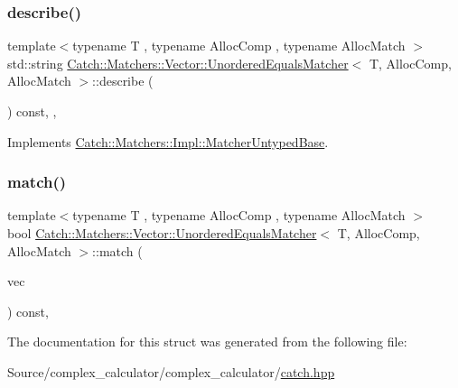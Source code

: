 \subsubsection{\texorpdfstring{describe()}{describe()}}
{\footnotesize\ttfamily template$<$typename T , typename Alloc\+Comp , typename Alloc\+Match $>$ \\
std\+::string \mbox{\hyperlink{struct_catch_1_1_matchers_1_1_vector_1_1_unordered_equals_matcher}{Catch\+::\+Matchers\+::\+Vector\+::\+Unordered\+Equals\+Matcher}}$<$ T, Alloc\+Comp, Alloc\+Match $>$\+::describe (\begin{DoxyParamCaption}{ }\end{DoxyParamCaption}) const\hspace{0.3cm}{\ttfamily [inline]}, {\ttfamily [override]}, {\ttfamily [virtual]}}



Implements \mbox{\hyperlink{class_catch_1_1_matchers_1_1_impl_1_1_matcher_untyped_base_a91d3a907dbfcbb596077df24f6e11fe2}{Catch\+::\+Matchers\+::\+Impl\+::\+Matcher\+Untyped\+Base}}.

\mbox{\label{struct_catch_1_1_matchers_1_1_vector_1_1_unordered_equals_matcher_abd5547585ba722cf3bb7aa3f9a8ffc0e}} 
\subsubsection{\texorpdfstring{match()}{match()}}
{\footnotesize\ttfamily template$<$typename T , typename Alloc\+Comp , typename Alloc\+Match $>$ \\
bool \mbox{\hyperlink{struct_catch_1_1_matchers_1_1_vector_1_1_unordered_equals_matcher}{Catch\+::\+Matchers\+::\+Vector\+::\+Unordered\+Equals\+Matcher}}$<$ T, Alloc\+Comp, Alloc\+Match $>$\+::match (\begin{DoxyParamCaption}\item[{std\+::vector$<$ T, Alloc\+Match $>$ const \&}]{vec }\end{DoxyParamCaption}) const\hspace{0.3cm}{\ttfamily [inline]}, {\ttfamily [override]}}



The documentation for this struct was generated from the following file\+:\begin{DoxyCompactItemize}
\item 
Source/complex\+\_\+calculator/complex\+\_\+calculator/\mbox{\hyperlink{catch_8hpp}{catch.\+hpp}}\end{DoxyCompactItemize}
